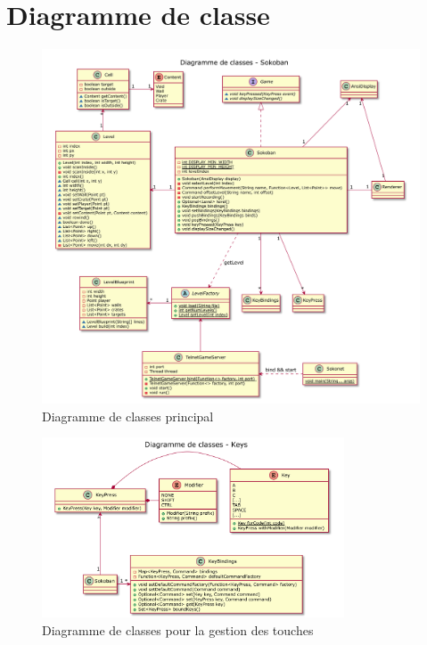 \documentclass[french]{article}
\begin{document}
	\section{Diagramme de classe}
	\begin{figure}[H]
		\includegraphics[width=\textwidth]{sokoban}
		\caption{Diagramme de classes principal}
		\label{classDiagMain}
	\end{figure}
	
	\begin{figure}[H]
		\includegraphics[width=0.8\textwidth]{keys}
		\caption{Diagramme de classes pour la gestion des touches}
		\label{classDiagKey}
	\end{figure}
	
\end{document}
